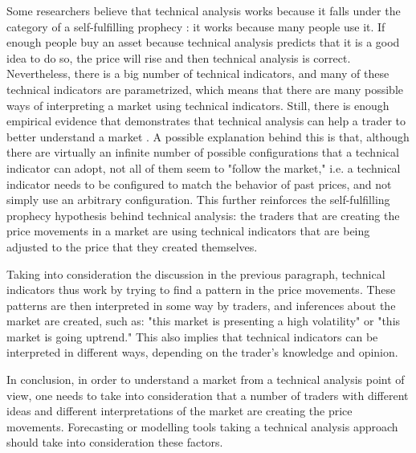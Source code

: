 Some researchers believe that technical analysis works because it falls under
the category of a self-fulfilling prophecy \cite{salganik2008leading}: it works
because many people use it. If enough people buy an asset because technical
analysis predicts that it is a good idea to do so, the price will rise and then
technical analysis is correct. Nevertheless, there is a big number of technical
indicators, and many of these technical indicators are parametrized, which means
that there are many possible ways of interpreting a market using technical
indicators. Still, there is enough empirical evidence that demonstrates that
technical analysis can help a trader to better understand a market
\cite{Achelis2000} \cite{Fund1992} \cite{Li1999}. 
A possible
explanation behind this is that, although there are virtually an infinite number
of possible configurations that a technical indicator can adopt, not all of them
seem to "follow the market," i.e. a technical indicator needs to be configured
to match the behavior of past prices, and not simply use an arbitrary
configuration. This further reinforces the self-fulfilling prophecy hypothesis
behind technical analysis: the traders that are creating the price movements in
a market are using technical indicators that are being adjusted to the price
that they created themselves.

Taking into consideration the discussion in the previous paragraph, technical
indicators thus work by trying to find a pattern in the price movements. These
patterns are then interpreted in some way by traders, and inferences about the
market are created, such as: "this market is presenting a high volatility" or
"this market is going uptrend." This also implies that technical indicators can
be interpreted in different ways, depending on the trader's knowledge and
opinion.

In conclusion, in order to understand a market from a technical analysis point
of view, one needs to take into consideration that a number of traders with
different ideas and different interpretations of the market are creating the
price movements. Forecasting or modelling tools taking a technical analysis
approach should take into consideration these factors. %


